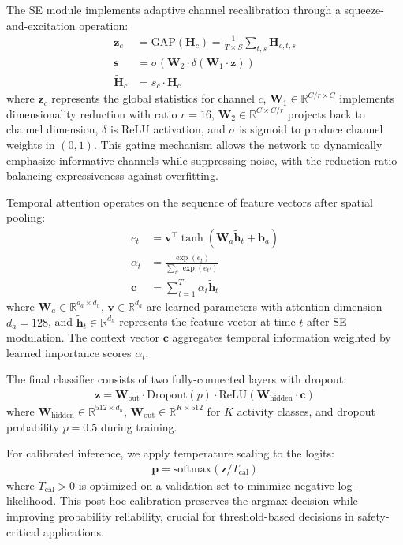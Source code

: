 \documentclass[journal]{IEEEtran}
\begin{document}
The SE module implements adaptive channel recalibration through a squeeze-and-excitation operation:
\begin{align}
\mathbf{z}_c &= \mathrm{GAP}(\mathbf{H}_c) = \frac{1}{T \times S} \sum_{t,s} \mathbf{H}_{c,t,s} \\
\mathbf{s} &= \sigma(\mathbf{W}_2 \cdot \delta(\mathbf{W}_1 \cdot \mathbf{z})) \\
\tilde{\mathbf{H}}_c &= s_c \cdot \mathbf{H}_c
\end{align}
where $\mathbf{z}_c$ represents the global statistics for channel $c$, $\mathbf{W}_1 \in \mathbb{R}^{C/r \times C}$ implements dimensionality reduction with ratio $r{=}16$, $\mathbf{W}_2 \in \mathbb{R}^{C \times C/r}$ projects back to channel dimension, $\delta$ is ReLU activation, and $\sigma$ is sigmoid to produce channel weights in $(0,1)$. This gating mechanism allows the network to dynamically emphasize informative channels while suppressing noise, with the reduction ratio balancing expressiveness against overfitting.

Temporal attention operates on the sequence of feature vectors after spatial pooling:
\begin{align}
e_t &= \mathbf{v}^\top \tanh(\mathbf{W}_a \tilde{\mathbf{h}}_t + \mathbf{b}_a) \\
\alpha_t &= \frac{\exp(e_t)}{\sum_{t'} \exp(e_{t'})} \\
\mathbf{c} &= \sum_{t=1}^{T} \alpha_t \tilde{\mathbf{h}}_t
\end{align}
where $\mathbf{W}_a \in \mathbb{R}^{d_a \times d_h}$, $\mathbf{v} \in \mathbb{R}^{d_a}$ are learned parameters with attention dimension $d_a{=}128$, and $\tilde{\mathbf{h}}_t \in \mathbb{R}^{d_h}$ represents the feature vector at time $t$ after SE modulation. The context vector $\mathbf{c}$ aggregates temporal information weighted by learned importance scores $\alpha_t$.

The final classifier consists of two fully-connected layers with dropout:
\begin{align}
\mathbf{z} = \mathbf{W}_{\text{out}} \cdot \mathrm{Dropout}(p) \cdot \mathrm{ReLU}(\mathbf{W}_{\text{hidden}} \cdot \mathbf{c})
\end{align}
where $\mathbf{W}_{\text{hidden}} \in \mathbb{R}^{512 \times d_h}$, $\mathbf{W}_{\text{out}} \in \mathbb{R}^{K \times 512}$ for $K$ activity classes, and dropout probability $p{=}0.5$ during training.

For calibrated inference, we apply temperature scaling to the logits:
\begin{align}
\mathbf{p} = \mathrm{softmax}(\mathbf{z}/T_{\text{cal}})
\end{align}
where $T_{\text{cal}} > 0$ is optimized on a validation set to minimize negative log-likelihood. This post-hoc calibration preserves the argmax decision while improving probability reliability, crucial for threshold-based decisions in safety-critical applications.
\end{document}
